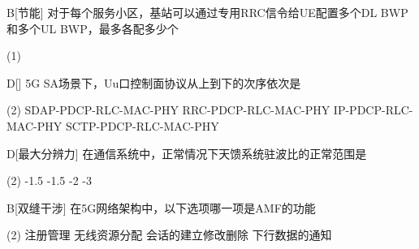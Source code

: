
\begin{choice}{B}[节能]
	对于每个服务小区，基站可以通过专用RRC信令给UE配置多个DL BWP和多个UL BWP，最多各配多少个
	\begin{tasks}(1)
	\end{tasks}
\end{choice}

\begin{choice}{D}[]
	5G SA场景下，Uu口控制面协议从上到下的次序依次是
	\begin{tasks}(2)
		\task SDAP-PDCP-RLC-MAC-PHY
		\task RRC-PDCP-RLC-MAC-PHY
		\task IP-PDCP-RLC-MAC-PHY
		\task SCTP-PDCP-RLC-MAC-PHY
	\end{tasks}
\end{choice}




\begin{choice}{D}[最大分辨力]
	在通信系统中，正常情况下天馈系统驻波比的正常范围是
	\begin{tasks}(2)
		-1.5
		-1.5
		-2
		-3
	\end{tasks}
\end{choice}


\begin{choice}{B}[双缝干涉]
	在5G网络架构中，以下选项哪一项是AMF的功能
	\begin{tasks}(2)
		\task 注册管理
		\task 无线资源分配
		\task 会话的建立修改删除
		\task 下行数据的通知
	\end{tasks}
\end{choice}


